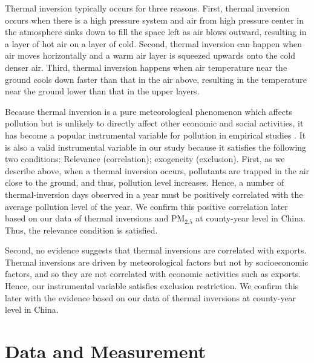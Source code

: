 \documentclass[12pt]{article}
\begin{document}
Thermal inversion typically occurs for three reasons. First, thermal inversion
occurs when there is a high pressure system and air from high pressure
center in the atmosphere sinks down to fill the space left as air blows
outward, resulting in a layer of hot air on a layer of cold. Second, thermal
inversion can happen when air moves horizontally and a warm air layer is
squeezed upwards onto the cold denser air. Third, thermal inversion
happens when air temperature near the ground cools down faster than that in
the air above, resulting in the temperature near the ground lower than that
in the upper layers. 

Because thermal inversion is a pure meteorological phenomenon which affects
pollution but is unlikely to directly affect other economic and social
activities, it has become a popular instrumental variable for pollution in
empirical studies %
\citep{arceo2016does,jans2018economic,sager2019estimating,chen2022effect,NBERw28401}%
. It is also a valid instrumental variable in our study because it satisfies
the following two conditions: Relevance (correlation); exogeneity (exclusion). First,
as we describe above, when a thermal inversion occurs, pollutants are
trapped in the air close to the ground, and thus, pollution level increases.
Hence, a number of thermal-inversion days observed in a year must be positively
correlated with the average pollution level of the year. We confirm this positive correlation later based on our data of thermal inversions and $\mathrm{PM_{2.5}}$ at county-year level in China. Thus, the relevance condition is satisfied.

  Second, no evidence suggests that thermal inversions are correlated with
  exports. Thermal inversions are driven by meteorological factors but not by
  socioeconomic factors, and so they are not correlated with economic activities
  such as exports. Hence, our instrumental variable satisfies exclusion restriction. We confirm this later with the evidence based on our data of
  thermal inversions at county-year level in China. 
  
  \section{Data and Measurement}

  \label{sec:3}
  
\end{document}
